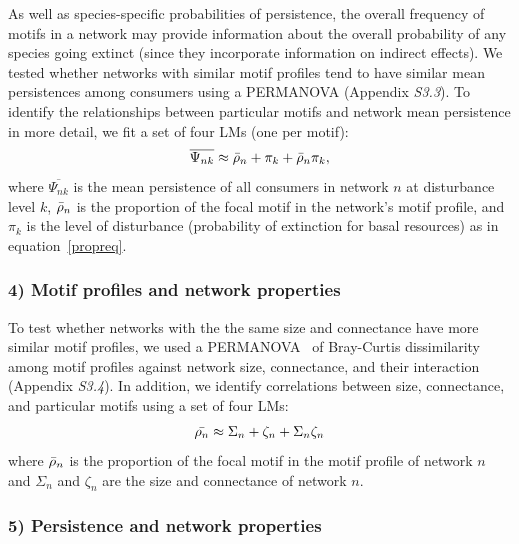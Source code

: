 \documentclass[12pt]{article}
\begin{document}
\begin{spacing}{2.0}
            As well as species-specific probabilities of persistence, the overall frequency of motifs in a network may provide information about the overall probability of any species going extinct (since they incorporate information on indirect effects).
            We tested whether networks with similar motif profiles tend to have similar mean persistences among consumers using a PERMANOVA (Appendix \emph{S3.3}).
            To identify the relationships between particular motifs and network mean persistence in more detail, we fit a set of four LMs (one per motif):
                \begin{equation}
                    \overline{\Psi_{nk}} \approx \Bar{\rho}_{n} + \pi_{k} + \Bar{\rho}_{n}\pi_{k},
                    \label{netpropeq}
                \end{equation}
            \noindent where $\overline{\Psi_{nk}}$ is the mean persistence of all consumers in network $n$ at disturbance level $k$, $\Bar{\rho}_{n}$ is the proportion of the focal motif in the network's motif profile, and $\pi_k$ is the level of disturbance (probability of extinction for basal resources) as in equation~\ref{propreq}.
                
        \subsubsection*{4) Motif profiles and network properties}
        
            To test whether networks with the the same size and connectance have more similar motif profiles, we used a PERMANOVA~\citep{Anderson2001} of Bray-Curtis dissimilarity among motif profiles against network size, connectance, and their interaction (Appendix \emph{S3.4}). 
            In addition, we identify correlations between size, connectance, and particular motifs using a set of four LMs:
            \begin{equation}
                \Bar{\rho_{n}} \approx \Sigma_{n} + \zeta_{n} + \Sigma_{n}\zeta_{n}
            \label{profile_global}
            \end{equation}
            \noindent where $\Bar{\rho}_{n}$ is the proportion of the focal motif in the motif profile of network $n$ and $\Sigma_n$ and $\zeta_{n}$ are the size and connectance of network $n$.
            
        \subsubsection*{5) Persistence and network properties}
            

\end{spacing}
\end{document}
